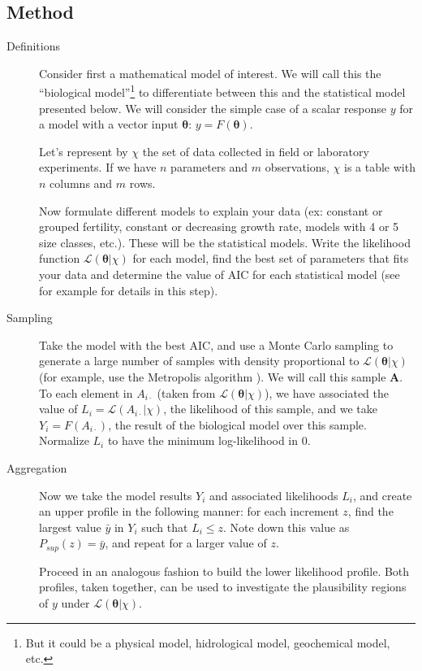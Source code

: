 \documentclass[twoside,12pt,a4paper]{article}
\newcommand{\bu}[1]{\mbox{$\mathbf{#1}$}}
\begin{document}
\subsection{Method}
\begin{description}
	\item[Definitions]
    Consider first a mathematical model of interest. We will call this the ``biological model''\footnote{
    But it could be a physical model, hidrological model, geochemical model, etc.}
    to differentiate between this and the statistical model presented below. We will consider the simple
    case of a scalar response $y$ for a model with a vector input $\bu{\theta}$: 
		$y = F(\bu{\theta})$.

    Let's represent by $\chi$ the set of data collected in field or laboratory experiments. If we have
    $n$ parameters and $m$ observations, $\chi$ is a table with $n$ columns and $m$ rows.

    Now formulate different models to explain your data (ex: constant or grouped fertility, constant or
    decreasing growth rate, models with 4 or 5 size classes, etc.). These will be the statistical models.
    Write the likelihood function $\mathcal{L}(\bu{\theta}|\chi)$ for each model, find the best
    set of parameters that fits your data and determine the value of AIC for each statistical model
    (see for example \citep{Burnham02} for details in this step). 
	\item[Sampling]
    Take the model with the best AIC, and use a Monte Carlo sampling to generate a large number of 
    samples with density proportional to 
    $\mathcal{L}(\bu{\theta}|\chi)$ (for example, use the Metropolis algorithm \citep{Tierney94}). 
    We will call this sample $\bu{A}$. To each element in 
    $A_{i \cdot}$ (taken from $\mathcal{L}(\bu{\theta}|\chi)$), we have associated the value of 
		$L_i = \mathcal{L}(A_{i \cdot} | \chi)$, the likelihood of this sample, and we take
		$Y_i = F(A_{i \cdot})$, the result of the biological model over this sample.
		Normalize $L_i$ to have the minimum log-likelihood in $0$.
	\item[Aggregation]
    Now we take the model results $Y_i$ and associated likelihoods $L_i$, and create an upper profile
    in the following manner: for each increment $z$, find the largest value 
		$\bar y$ in $Y_i$ such that $L_i \leq z$. Note down this value as $P_{sup}(z) = \bar y$,
    and repeat for a larger value of $z$.

    Proceed in an analogous fashion to build the lower likelihood profile. Both profiles, taken together,
    can be used to investigate the plausibility regions of $y$ under $\mathcal{L}(\bu{\theta}|\chi)$.
\end{description}
\end{document}
